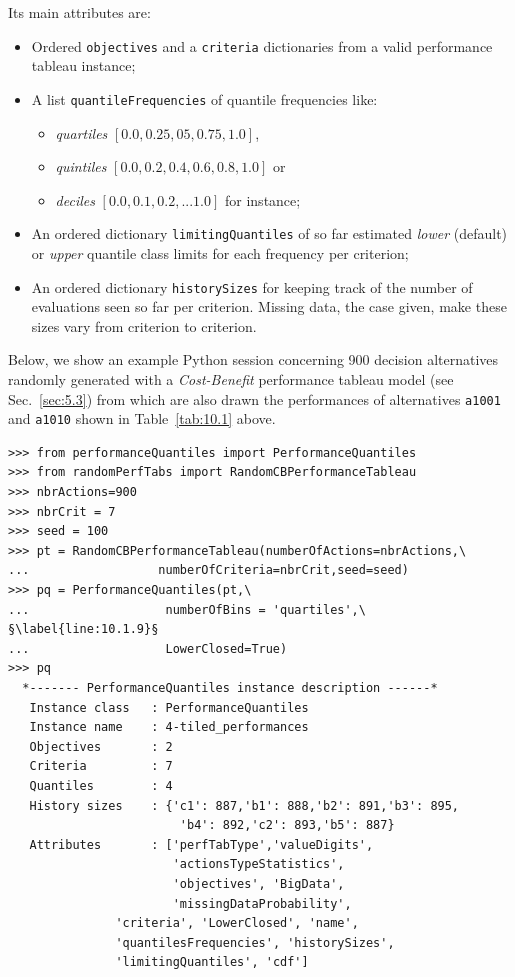 Its main attributes are:
\begin{itemize}[rightmargin=0.5cm,leftmargin=0.5cm,topsep=1pt]
\item Ordered \texttt{objectives} and a \texttt{criteria} dictionaries from a valid performance tableau instance;
\item A list \texttt{quantileFrequencies} of quantile frequencies like:
  \begin{itemize}[nosep]
  \item \emph{quartiles} $[0.0, 0.25, 05, 0.75,1.0]$,
  \item  \emph{quintiles} $[0.0, 0.2, 0.4, 0.6, 0.8, 1.0]$ or
  \item  \emph{deciles} $[0.0, 0.1, 0.2, ... 1.0]$ for instance;
  \end{itemize}
\item An ordered  dictionary \texttt{limitingQuantiles} of so far estimated \emph{lower} (default) or \emph{upper} quantile class limits for each frequency per criterion;
\item An ordered dictionary \texttt{historySizes} for keeping track of the number of evaluations seen so far per criterion. Missing data, the case given, make these sizes vary from criterion to criterion.
\end{itemize}

Below, we show an example Python session concerning 900 decision alternatives randomly generated with a \emph{Cost-Benefit} performance tableau model (see Sec.~\ref{sec:5.3}) from which are also drawn the performances of alternatives \texttt{a1001} and \texttt{a1010} shown in Table~\vref{tab:10.1} above.
\begin{lstlisting}[caption={Computing performance quantiles from a given performance tableau},label=list:10.1]
>>> from performanceQuantiles import PerformanceQuantiles
>>> from randomPerfTabs import RandomCBPerformanceTableau
>>> nbrActions=900
>>> nbrCrit = 7
>>> seed = 100
>>> pt = RandomCBPerformanceTableau(numberOfActions=nbrActions,\
...                  numberOfCriteria=nbrCrit,seed=seed)
>>> pq = PerformanceQuantiles(pt,\
...                   numberOfBins = 'quartiles',\ §\label{line:10.1.9}§
...                   LowerClosed=True)
>>> pq
  *------- PerformanceQuantiles instance description ------*
   Instance class   : PerformanceQuantiles
   Instance name    : 4-tiled_performances
   Objectives       : 2
   Criteria         : 7
   Quantiles        : 4
   History sizes    : {'c1': 887,'b1': 888,'b2': 891,'b3': 895,
                        'b4': 892,'c2': 893,'b5': 887}
   Attributes       : ['perfTabType','valueDigits',
                       'actionsTypeStatistics',
                       'objectives', 'BigData',
                       'missingDataProbability',
		       'criteria', 'LowerClosed', 'name',
		       'quantilesFrequencies', 'historySizes',
		       'limitingQuantiles', 'cdf']
\end{lstlisting}

